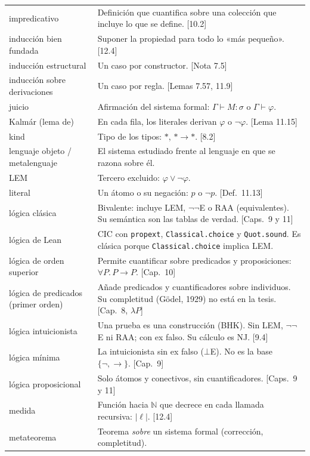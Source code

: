 \documentclass[11pt,a4paper]{article}
\begin{document}
{\begin{longtable}{@{}p{}p{}@{}}
impredicativo & Definición que cuantifica sobre una colección que incluye lo que se define. [10.2]\\
inducción bien fundada & Suponer la propiedad para todo lo «más pequeño». [12.4]\\
inducción estructural & Un caso por constructor. [Nota 7.5]\\
inducción sobre derivaciones & Un caso por regla. [Lemas 7.57, 11.9]\\
juicio & Afirmación del sistema formal: \(\Gamma\vdash M:\sigma\) o \(\Gamma\vdash\varphi\).\\
Kalmár (lema de) & En cada fila, los literales derivan \(\varphi\) o \(\neg\varphi\). [Lema 11.15]\\
kind & Tipo de los tipos: \(*\), \(*\to*\). [8.2]\\
lenguaje objeto / metalenguaje & El sistema estudiado frente al lenguaje en que se razona sobre él.\\
LEM & Tercero excluido: \(\varphi\vee\neg\varphi\).\\
literal & Un átomo o su negación: \(p\) o \(\neg p\). [Def.\ 11.13]\\
lógica clásica & Bivalente: incluye LEM, \(\neg\neg\)E o RAA (equivalentes). Su semántica son las tablas de verdad. [Caps.\ 9 y 11]\\
lógica de Lean & CIC con \texttt{propext}, \texttt{Classical.choice} y \texttt{Quot.sound}. Es clásica porque \texttt{Classical.choice} implica LEM.\\
lógica de orden superior & Permite cuantificar sobre predicados y proposiciones: \(\forall P.\,P\to P\). [Cap.\ 10]\\
lógica de predicados (primer orden) & Añade predicados y cuantificadores sobre individuos. Su completitud (Gödel, 1929) no está en la tesis. [Cap.\ 8, \(\lambda P\)]\\
lógica intuicionista & Una prueba es una construcción (BHK). Sin LEM, \(\neg\neg\)E ni RAA; con ex falso. Su cálculo es NJ. [9.4]\\
lógica mínima & La intuicionista sin ex falso (\(\bot\)E). No es la base \(\{\neg,\to\}\). [Cap.\ 9]\\
lógica proposicional & Solo átomos y conectivos, sin cuantificadores. [Caps.\ 9 y 11]\\
medida & Función hacia \(\mathbb N\) que decrece en cada llamada recursiva: \(|\ell|\). [12.4]\\
metateorema & Teorema \emph{sobre} un sistema formal (corrección, completitud).\\

\end{longtable}}
\end{document}
